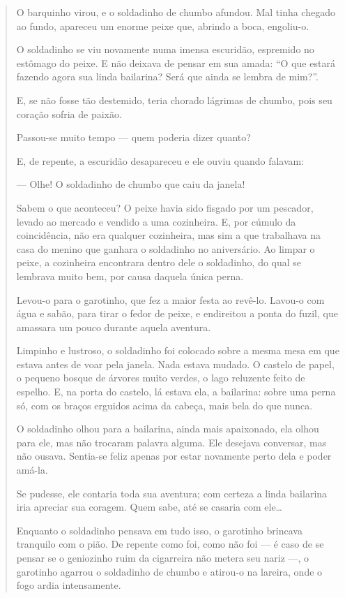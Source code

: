 \begin{conteudo}
\begin{conteudo}
\begin{conteudo}
\begin{conteudo}
\begin{quote}
O barquinho virou, e o soldadinho de chumbo afundou. Mal tinha chegado
ao fundo, apareceu um enorme peixe que, abrindo a boca, engoliu-o.

O soldadinho se viu novamente numa imensa escuridão, espremido no
estômago do peixe. E não deixava de pensar em sua amada: ``O que estará
fazendo agora sua linda bailarina? Será que ainda se lembra de mim?''.

E, se não fosse tão destemido, teria chorado lágrimas de chumbo, pois
seu coração sofria de paixão.

Passou-se muito tempo --- quem poderia dizer quanto?

E, de repente, a escuridão desapareceu e ele ouviu quando falavam:

--- Olhe! O soldadinho de chumbo que caiu da janela!

Sabem o que aconteceu? O peixe havia sido fisgado por um pescador,
levado ao mercado e vendido a uma cozinheira. E, por cúmulo da
coincidência, não era qualquer cozinheira, mas sim a que trabalhava na
casa do menino que ganhara o soldadinho no aniversário. Ao limpar o
peixe, a cozinheira encontrara dentro dele o soldadinho, do qual se
lembrava muito bem, por causa daquela única perna.

Levou-o para o garotinho, que fez a maior festa ao revê-lo. Lavou-o com
água e sabão, para tirar o fedor de peixe, e endireitou a ponta do
fuzil, que amassara um pouco durante aquela aventura.

Limpinho e lustroso, o soldadinho foi colocado sobre a mesma mesa em que
estava antes de voar pela janela. Nada estava mudado. O castelo de
papel, o pequeno bosque de árvores muito verdes, o lago reluzente feito
de espelho. E, na porta do castelo, lá estava ela, a bailarina: sobre
uma perna só, com os braços erguidos acima da cabeça, mais bela do que
nunca.

O soldadinho olhou para a bailarina, ainda mais apaixonado, ela olhou
para ele, mas não trocaram palavra alguma. Ele desejava conversar, mas
não ousava. Sentia-se feliz apenas por estar novamente perto dela e
poder amá-la.

Se pudesse, ele contaria toda sua aventura; com certeza a linda
bailarina iria apreciar sua coragem. Quem sabe, até se casaria com
ele\ldots{}

Enquanto o soldadinho pensava em tudo isso, o garotinho brincava
tranquilo com o pião. De repente como foi, como não foi --- é caso de se
pensar se o geniozinho ruim da cigarreira não metera seu nariz ---, o
garotinho agarrou o soldadinho de chumbo e atirou-o na lareira, onde o
fogo ardia intensamente.


\end{quote}
\end{conteudo}
\end{conteudo}
\end{conteudo}
\end{conteudo}
